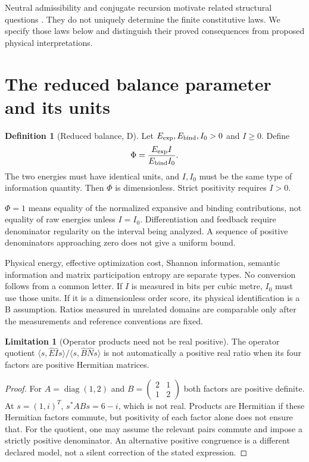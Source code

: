 \documentclass[11pt,letterpaper]{article}
\newcommand{\diag}{\operatorname{diag}}
\theoremstyle{definition}
\newtheorem{definition}[theorem]{Definition}
\newtheorem{limitation}[theorem]{Limitation}
\numberwithin{equation}{section}
\begin{document}
Neutral admissibility and conjugate recursion motivate related structural questions \cite{level0,conjugate}. They do not uniquely determine the finite constitutive laws. We specify those laws below and distinguish their proved consequences from proposed physical interpretations.

\section{The reduced balance parameter and its units}
\begin{definition}[Reduced balance, D]\label{baldef}
Let $E_{\rm exp},E_{\rm bind},I_0>0$ and $I\geq0$. Define
\begin{equation}\label{phi}
\Phi=\frac{E_{\rm exp}I}{E_{\rm bind}I_0}.
\end{equation}
The two energies must have identical units, and $I,I_0$ must be the same type of information quantity. Then $\Phi$ is dimensionless. Strict positivity requires $I>0$.
\end{definition}
$\Phi=1$ means equality of the normalized expansive and binding contributions, not equality of raw energies unless $I=I_0$. Differentiation and feedback require denominator regularity on the interval being analyzed. A sequence of positive denominators approaching zero does not give a uniform bound.

Physical energy, effective optimization cost, Shannon information, semantic information and matrix participation entropy are separate types. No conversion follows from a common letter. If $I$ is measured in bits per cubic metre, $I_0$ must use those units. If it is a dimensionless order score, its physical identification is a B assumption. Ratios measured in unrelated domains are comparable only after the measurements and reference conventions are fixed.

\begin{limitation}[Operator products need not be real positive]\label{products}
The operator quotient $\langle s,\widehat E\widehat I s\rangle/\langle s,\widehat B\widehat N s\rangle$ is not automatically a positive real ratio when its four factors are positive Hermitian matrices.
\end{limitation}
\begin{proof}
For $A=\diag(1,2)$ and $B=\left(\begin{smallmatrix}2&1\\1&2\end{smallmatrix}\right)$ both factors are positive definite. At $s=(1,i)^T$, $s^*ABs=6-i$, which is not real. Products are Hermitian if these Hermitian factors commute, but positivity of each factor alone does not ensure that. For the quotient, one may assume the relevant pairs commute and impose a strictly positive denominator. An alternative positive congruence is a different declared model, not a silent correction of the stated expression.
\end{proof}
\end{document}
